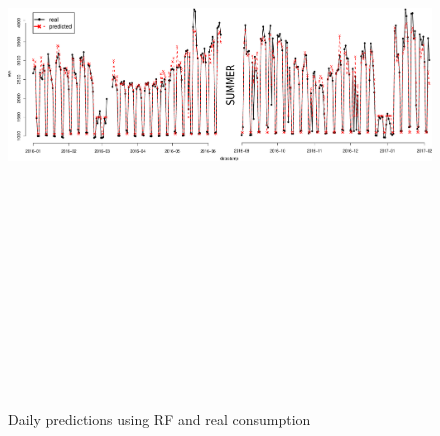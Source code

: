 \documentclass[10pt, conference, compsocconf]{IEEEtran}
\begin{document}
\begin{figure}[t!]
  \includegraphics[width=17cm,height=17cm,keepaspectratio]{./pics/two_daily-iii.pdf}
  \caption{Daily predictions using RF and real consumption}
  \label{fig:daily}
\end{figure}

%
\end{document}
